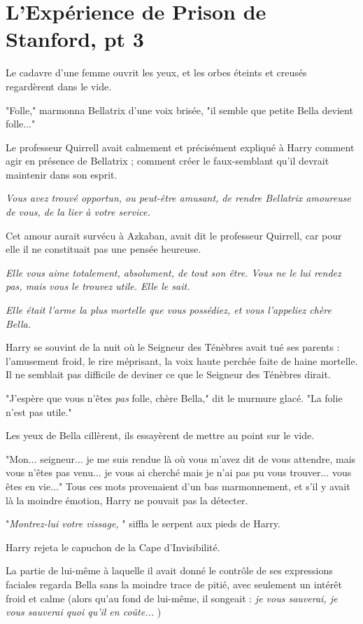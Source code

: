 
\chapter{L'Expérience de Prison de Stanford, pt 3}

Le cadavre d'une femme ouvrit les yeux, et les orbes éteints et creusés regardèrent dans le vide.

"Folle," marmonna Bellatrix d'une voix brisée, "il semble que petite Bella devient folle..."

Le professeur Quirrell avait calmement et précisément expliqué à Harry comment agir en présence de Bellatrix ; comment créer le faux-semblant qu'il devrait maintenir dans son esprit.

\emph{Vous avez trouvé opportun, ou peut-être amusant, de rendre Bellatrix amoureuse de vous, de la lier à votre service.} 

Cet amour aurait survécu à Azkaban, avait dit le professeur Quirrell, car pour elle il ne constituait pas une pensée heureuse.

\emph{Elle vous aime totalement, absolument, de tout son être. Vous ne le lui rendez pas, mais vous le trouvez utile. Elle le sait.} 

\emph{Elle était l'arme la plus mortelle que vous possédiez, et vous l'appeliez chère Bella.} 

Harry se souvint de la nuit où le Seigneur des Ténèbres avait tué ses parents : l'amusement froid, le rire méprisant, la voix haute perchée faite de haine mortelle. Il ne semblait pas difficile de deviner ce que le Seigneur des Ténèbres dirait.

"J'espère que vous n'êtes \emph{pas}  folle, chère Bella," dit le murmure glacé. "La folie n'est pas utile."

Les yeux de Bella cillèrent, ils essayèrent de mettre au point sur le vide.

"Mon... seigneur... je me suis rendue là où vous m'avez dit de vous attendre, mais vous n'êtes pas venu... je vous ai cherché mais je n'ai pas pu vous trouver... vous êtes en vie..." Tous ces mots provenaient d'un bas marmonnement, et s'il y avait là la moindre émotion, Harry ne pouvait pas la détecter.

"\emph{Montrez-lui votre vissage,} " siffla le serpent aux pieds de Harry.

Harry rejeta le capuchon de la Cape d'Invisibilité.

La partie de lui-même à laquelle il avait donné le contrôle de ses expressions faciales regarda Bella sans la moindre trace de pitié, avec seulement un intérêt froid et calme (alors qu'au fond de lui-même, il songeait : \emph{je vous sauverai, je vous sauverai quoi qu'il en coûte...} )

